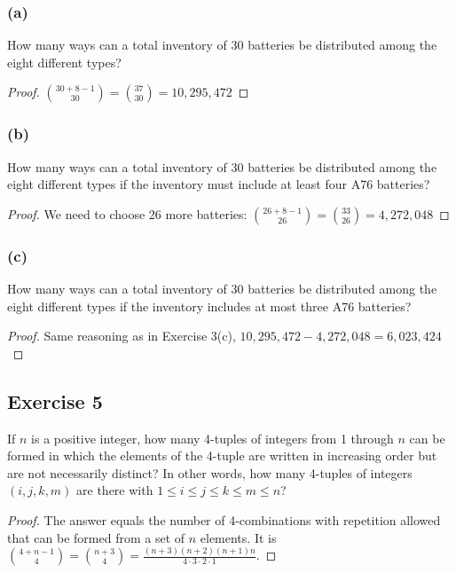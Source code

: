 \documentclass[14pt]{extarticle}
\begin{document}
\subsubsection{(a)}
How many ways can a total inventory of 30 batteries be distributed among the eight different types?

\begin{proof}
     \(\binom{30+8-1}{30} = \binom{37}{30} = 10,295,472\)
\end{proof}

\subsubsection{(b)}
How many ways can a total inventory of 30 batteries be distributed among the eight different types if the inventory must include at least four A76 batteries?

\begin{proof}
     We need to choose 26 more batteries: \(\binom{26+8-1}{26} = \binom{33}{26} = 4,272,048\)
\end{proof}

\subsubsection{(c)}
How many ways can a total inventory of 30 batteries be distributed among the eight different types if the inventory
includes at most three A76 batteries?

\begin{proof}
     Same reasoning as in Exercise 3(c), \(10,295,472 - 4,272,048 = 6,023,424\)
\end{proof}

\subsection{Exercise 5}
If \(n\) is a positive integer, how many 4-tuples of integers from 1 through \(n\) can be formed in which the elements of
the 4-tuple are written in increasing order but are not necessarily distinct? In other words, how many 4-tuples of
integers \((i, j, k, m)\) are there with \(1 \leq i \leq j \leq k \leq m \leq n\)?

\begin{proof}
     The answer equals the number of 4-combinations with repetition allowed that can be formed from a set of \(n\) elements. It is
     \(\binom{4+n-1}{4} = \binom{n+3}{4} = \frac{(n+3)(n+2)(n+1)n}{4 \cdot 3 \cdot 2 \cdot 1}\).
\end{proof}
\end{document}
